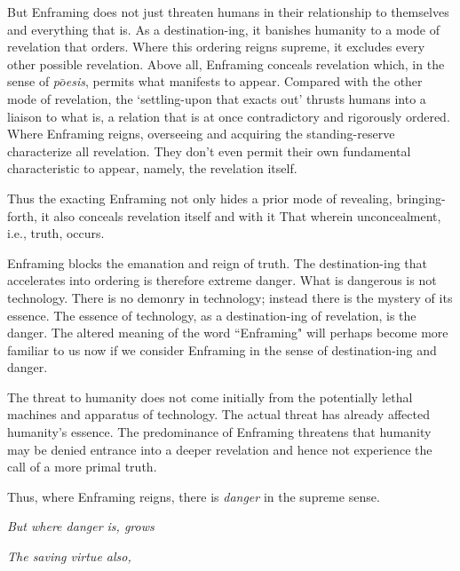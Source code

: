 \documentclass[paper=a4, fontsize=11pt,twoside]{scrartcl}
\begin{document}
But Enframing does not just threaten humans in their relationship to themselves and everything that is. As a destination-ing, it banishes humanity to a mode of revelation that orders. Where this ordering reigns supreme, it excludes every other possible revelation. Above all, Enframing conceals revelation which, in the sense of \textit{p$\bar{o}$esis}, permits what manifests to appear. Compared with the other mode of revelation, the `settling-upon that exacts out' thrusts humans into a liaison to what is, a relation that is at once contradictory and rigorously ordered. Where Enframing reigns, overseeing and acquiring the standing-reserve characterize all revelation. They don't even permit their own fundamental characteristic to appear, namely, the revelation itself.

Thus the exacting Enframing not only hides a prior mode of revealing, bringing-forth, it also conceals revelation itself and with it That wherein unconcealment, i.e., truth, occurs.

Enframing blocks the emanation and reign of truth. The destination-ing that accelerates into ordering is therefore extreme danger. What is dangerous is not technology. There is no demonry in technology; instead there is the mystery of its essence. The essence of technology, as a destination-ing of revelation, is the danger. The altered meaning of the word ``Enframing" will perhaps become more familiar to us now if we consider Enframing in the sense of destination-ing and danger.

The threat to humanity does not come initially from the potentially lethal machines and apparatus of technology. The actual threat has already affected humanity's essence. The predominance of Enframing threatens that humanity may be denied entrance into a deeper revelation and hence not experience the call of a more primal truth.

Thus, where Enframing reigns, there is \textit{danger} in the supreme sense.

\vspace{5mm}

\begin{center}
\textit{But where danger is, grows}

\textit{The saving virtue also,}
\end{center}

\vspace{5mm}
\end{document}
